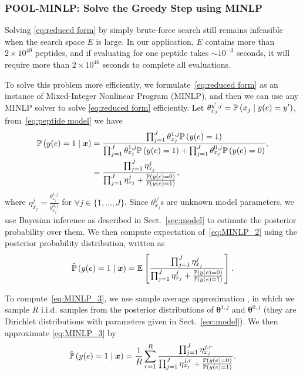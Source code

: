 \subsubsection{POOL-MINLP: Solve the Greedy Step using MINLP} \label{sec:MINLP approach}
Solving \eqref{eq:reduced form} by simply brute-force search still remains infeasible when the search space $E$ is large. In our application,
$E$ contains more than $2 \times 10^{49}$ peptides, and if evaluating for one peptide takes $\sim 10^{-3}$ seconds, it will
require more than $2 \times 10^{46}$ seconds to complete all evaluations. 

To solve this problem more efficiently, we formulate~\eqref{eq:reduced form} as an instance of Mixed-Integer Nonlinear Program (MINLP), 
and then we can use any MINLP solver to solve \eqref{eq:reduced form} efficiently. 
Let $\theta^{y', j}_{x_j} = \mathbb{P} \left( x_j \mid y(e) = y' \right)$, from~\eqref{eq:peptide model} we have
\begin{equation}
\begin{split}
  \mathbb{P} \left(y(e \right) = 1 \mid \bm{x}) &= \frac{\prod_{j=1}^J \theta^{1, j}_{x_j} \mathbb{P}\left( y(e)=1 \right)}{\prod_{j=1}^J \theta^{1, j}_{x_j} \mathbb{P}\left( y(e)=1 \right) + \prod_{j=1}^J \theta^{0, j}_{x_j} \mathbb{P}\left( y(e)=0 \right)}, \\
  &= \frac{\prod_{j = 1}^J \eta^j_{x_j}}{\prod_{j=1}^J \eta^j_{x_j} + \frac{\mathbb{P} \left(y(e) = 0 \right)}{\mathbb{P} \left( y(e) = 1 \right)}},
  \label{eq:MINLP_2}
\end{split}
\end{equation}
where $\eta^j_{x_j} = \frac{\theta^{1,j}_{x_j}}{\theta^{0,j}_{x_j}}$ for $\forall j \in \{1,\ldots,J\}$. Since $\theta^{y'}_{x_j}$s are unknown model parameters,
we use Bayesian inference as described in Sect.~\ref{sec:model} to estimate the posterior probability over them. We then compute expectation of~\eqref{eq:MINLP_2}
using the posterior probability distribution, written as
\begin{equation}
  \hat{\mathbb{P}} \left(y(e \right) = 1 \mid \bm{x}) = \mathbb{E} \left[ \frac{\prod_{j = 1}^J \eta^j_{x_j}}{\prod_{j=1}^J \eta^j_{x_j} + \frac{\mathbb{P} \left(y(e) = 0 \right)}{\mathbb{P} \left( y(e) = 1 \right)}} \right].
  \label{eq:MINLP_3}
\end{equation}

To compute~\eqref{eq:MINLP_3}, we use sample average approximation \cite{kleywegt2002sample}, in which we sample 
$R$ i.i.d. samples from the posterior distributions of $\bm{\theta}^{1, j}$ and $\bm{\theta}^{0, j}$ 
(they are Dirichlet distributions with parameters given in Sect.~\ref{sec:model}). 
We then approximate \eqref{eq:MINLP_3} by 
\begin{equation}
\hat{\mathbb{P}} \left(y(e \right) = 1 \mid \bm{x}) = \frac{1}{R} \sum_{r = 1}^R \frac{\prod_{j=1}^J \eta^{j, r}_{x_j}}{\prod_{j=1}^J \eta^{j, r}_{x_j} + \frac{\mathbb{P} \left(y(e) = 0 \right)}{\mathbb{P} \left( y(e) = 1 \right)}}.
\label{eq:MINLP_4}
\end{equation}

